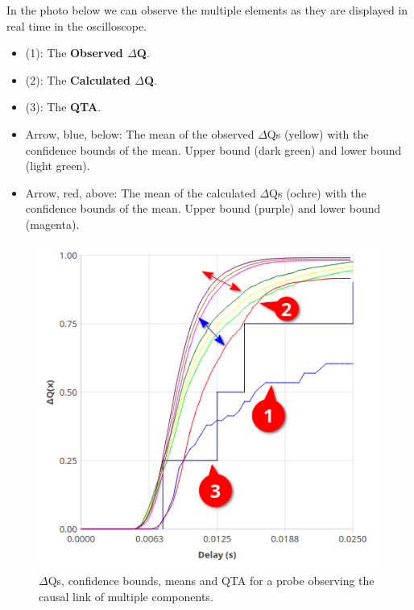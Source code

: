     In the photo below we can observe the multiple elements as they are displayed in real time in the oscilloscope.
    \begin{itemize}
        \item (1): The \textbf{Observed $\Delta$Q}.
        \item (2): The \textbf{Calculated $\Delta$Q}.
        \item (3): The \textbf{QTA}.
        \item Arrow, blue, below: The mean of the observed $\Delta$Qs (yellow) with the confidence bounds of the mean. Upper bound (dark green) and lower bound (light green).
        \item Arrow, red, above: The mean of the calculated $\Delta$Qs (ochre) with the confidence bounds of the mean. Upper bound (purple) and lower bound (magenta).
    \end{itemize}
     \begin{figure}[H]
        \begin{center}
            \includegraphics[scale = 0.8]{img/overload_2/qta_triggerd2.png}
        \end{center}
         \caption{$\Delta$Qs, confidence bounds, means and QTA for a probe observing the causal link of multiple components.}
    \end{figure}
        

